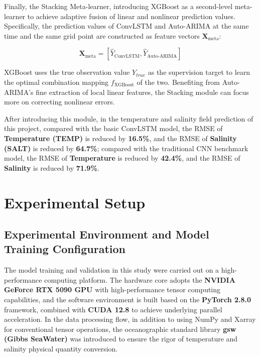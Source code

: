 \documentclass[webpdf,contemporary,large]{oup-authoring-template}
\begin{document}
Finally, the Stacking Meta-learner, introducing XGBoost as a second-level meta-learner to achieve adaptive fusion of linear and nonlinear prediction values. Specifically, the prediction values of ConvLSTM and Auto-ARIMA at the same time and the same grid point are constructed as feature vectors $\mathbf{X}_{\text{meta}}$:

\begin{equation}
\mathbf{X}_{\text{meta}} = \left[ \hat{Y}_{\text{ConvLSTM}}, \hat{Y}_{\text{Auto-ARIMA}} \right]
\end{equation}

XGBoost uses the true observation value $Y_{true}$ as the supervision target to learn the optimal combination mapping $f_{\text{XGBoost}}$ of the two. Benefiting from Auto-ARIMA's fine extraction of local linear features, the Stacking module can focus more on correcting nonlinear errors.

After introducing this module, in the temperature and salinity field prediction of this project, compared with the basic ConvLSTM model, the RMSE of \textbf{Temperature (TEMP)} is reduced by \textbf{16.5\%}, and the RMSE of \textbf{Salinity (SALT)} is reduced by \textbf{64.7\%}; compared with the traditional CNN benchmark model, the RMSE of \textbf{Temperature} is reduced by \textbf{42.4\%}, and the RMSE of \textbf{Salinity} is reduced by \textbf{71.9\%}.

\section{Experimental Setup}

\subsection{Experimental Environment and Model Training Configuration}

The model training and validation in this study were carried out on a high-performance computing platform. The hardware core adopts the \textbf{NVIDIA GeForce RTX 5090 GPU} with high-performance tensor computing capabilities, and the software environment is built based on the \textbf{PyTorch 2.8.0} framework, combined with \textbf{CUDA 12.8} to achieve underlying parallel acceleration. In the data processing flow, in addition to using NumPy and Xarray for conventional tensor operations, the oceanographic standard library \textbf{gsw (Gibbs SeaWater)} was introduced to ensure the rigor of temperature and salinity physical quantity conversion.
\end{document}
